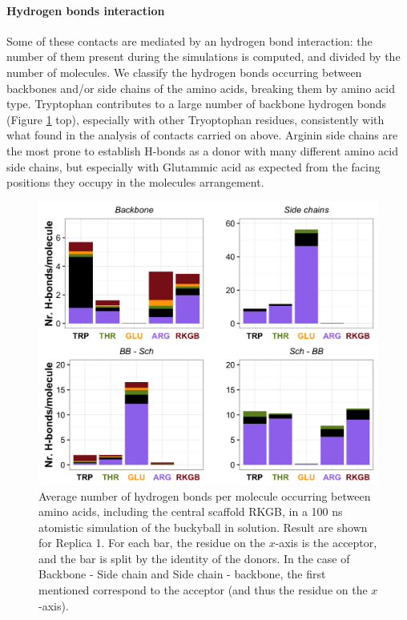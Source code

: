 \paragraph{Hydrogen bonds interaction} Some of these contacts are mediated by an hydrogen bond interaction: the number of them present during the simulations is computed, and divided by the number of molecules.
We classify the hydrogen bonds occurring between backbones and/or side chains of the amino acids, breaking them by amino acid type. Tryptophan contributes to a large number of backbone hydrogen bonds (Figure \ref{fig:BTI_hbonds} top), especially with other Tryoptophan residues, consistently with what found in the analysis of contacts carried on above. Arginin side chains are the most prone to establish H-bonds as a donor with many different amino acid side chains, but especially with Glutammic acid as expected from the facing positions they occupy in the molecules arrangement.
%
\begin{figure}[t]
\centering
\includegraphics[width=0.85\linewidth]{3results_capsule/pics/Hb_all.png} 
\caption[Hydrogen bonds in the buckyball molecule]{Average number of hydrogen bonds per molecule occurring between amino acids, including the central scaffold RKGB, in a 100 ns atomistic simulation of the buckyball in solution. Result are shown for Replica 1. For each bar, the residue on the $x$-axis is the acceptor, and the bar is split by the identity of the donors. In the case of Backbone - Side chain and Side chain - backbone, the first mentioned correspond to the acceptor (and thus the residue on the $x$-axis).}
\label{fig:BTI_hbonds}
\end{figure}

